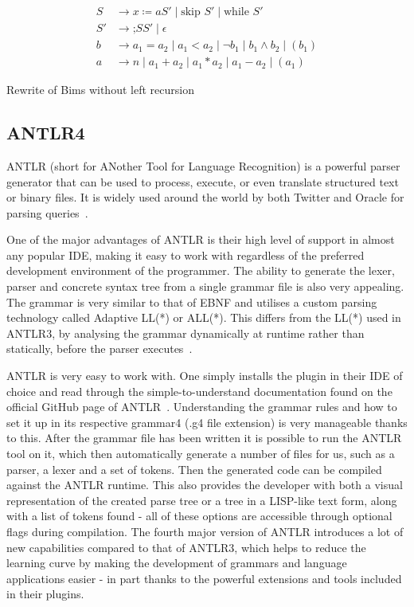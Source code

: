

\begin{table}[htb!]
  \centering
  \begin{align*}
    S  & \rightarrow x \coloneqq a S' \mid \text{skip } S' \mid \text{while } S'          \\
    S' & \rightarrow \text{;} S S'\mid \epsilon                                           \\
    b  & \rightarrow a_1 = a_2 \mid a_1 < a_2 \mid \neg b_1 \mid b_1 \land b_2 \mid (b_1) \\
    a  & \rightarrow n \mid a_1 + a_2 \mid a_1 * a_2 \mid a_1 - a_2 \mid (a_1)
  \end{align*}
  \caption{Rewrite of Bims without left recursion}
  \label{tab:bimsrewrite}
\end{table}


\subsection{ANTLR4}
ANTLR (short for ANother Tool for Language Recognition) is a powerful parser generator that can be used to process, execute, or even translate structured text or binary files. It is widely used around the world by both Twitter and Oracle for parsing queries~\cite{ANTLR_About}.

One of the major advantages of ANTLR is their high level of support in almost any popular IDE, making it easy to work with regardless of the preferred development environment of the programmer. The ability to generate the lexer, parser and concrete syntax tree from a single grammar file is also very appealing. The grammar is very similar to that of EBNF and utilises a custom parsing technology called Adaptive LL(*) or ALL(*). This differs from the LL(*) used in ANTLR3, by analysing the grammar dynamically at runtime rather than statically, before the parser executes~\cite{Parr2014}.

ANTLR is very easy to work with. One simply installs the plugin in their IDE of choice and read through the simple-to-understand documentation found on the official GitHub page of ANTLR~\cite{ANTLR_Documentation}. Understanding the grammar rules and how to set it up in its respective grammar4 (.g4 file extension) is very manageable thanks to this. After the grammar file has been written it is possible to run the ANTLR tool on it, which then automatically generate a number of files for us, such as a parser, a lexer and a set of tokens. Then the generated code can be compiled against the ANTLR runtime. This also provides the developer with both a visual representation of the created parse tree or a tree in a LISP-like text form, along with a list of tokens found - all of these options are accessible through optional flags during compilation. The fourth major version of ANTLR introduces a lot of new capabilities compared to that of ANTLR3, which helps to reduce the learning curve by making the development of grammars and language applications easier - in part thanks to the powerful extensions and tools included in their plugins.

